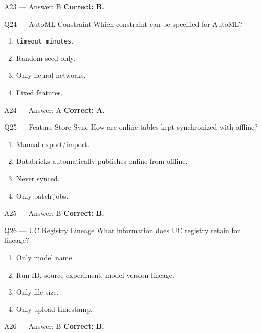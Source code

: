 \documentclass[aspectratio=169,9pt]{beamer}
\begin{document}
	\begin{frame}{A23 — Answer: B}
		\textbf{Correct: B.}
	\end{frame}
	
	\begin{frame}{Q24 — AutoML Constraint}
		Which constraint can be specified for AutoML?
		\begin{enumerate}[label=\Alph*.]
			\item \texttt{timeout\_minutes}.
			\item Random seed only.
			\item Only neural networks.
			\item Fixed features.
		\end{enumerate}
	\end{frame}
	
	\begin{frame}{A24 — Answer: A}
		\textbf{Correct: A.}
	\end{frame}
	
	\begin{frame}{Q25 — Feature Store Sync}
		How are online tables kept synchronized with offline?
		\begin{enumerate}[label=\Alph*.]
			\item Manual export/import.
			\item Databricks automatically publishes online from offline.
			\item Never synced.
			\item Only batch jobs.
		\end{enumerate}
	\end{frame}
	
	\begin{frame}{A25 — Answer: B}
		\textbf{Correct: B.}
	\end{frame}
	
	\begin{frame}{Q26 — UC Registry Lineage}
		What information does UC registry retain for lineage?
		\begin{enumerate}[label=\Alph*.]
			\item Only model name.
			\item Run ID, source experiment, model version lineage.
			\item Only file size.
			\item Only upload timestamp.
		\end{enumerate}
	\end{frame}
	
	\begin{frame}{A26 — Answer: B}
		\textbf{Correct: B.}
	\end{frame}
	
\end{document}
